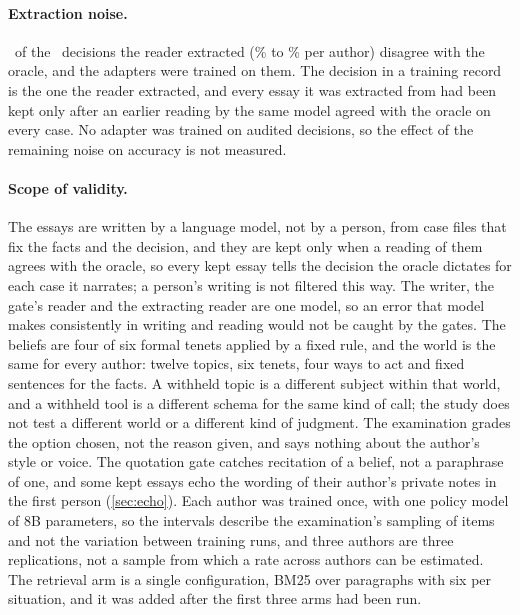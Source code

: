 \paragraph{Extraction noise.}
\AuditDisagreeAll\ of the \AuditKeptAll\ decisions the reader extracted
(\AuditDisagreeRateMin\% to \AuditDisagreeRateMax\% per author) disagree with the oracle, and
the adapters were trained on them. The decision in a training record is the one the reader
extracted, and every essay it was extracted from had been kept only after an earlier reading
by the same model agreed with the oracle on every case. No adapter
was trained on audited decisions, so the effect of the remaining noise on accuracy is not
measured.

\paragraph{Scope of validity.}
The essays are written by a language model, not by a person, from case files that fix the
facts and the decision, and they are kept only when a reading of them agrees with the oracle,
so every kept essay tells the decision the oracle dictates for each case it narrates; a
person's writing is not filtered this way. The writer, the gate's reader and the extracting
reader are one model, so an error that model makes consistently in writing and reading would
not be caught by the gates. The beliefs are four of six formal tenets applied by a fixed rule,
and the world is the same for every author: twelve topics, six tenets, four ways to act and
fixed sentences for the facts. A withheld topic is a different subject within that world, and
a withheld tool is a different schema for the same kind of call; the study does not test a
different world or a different kind of judgment. The examination grades the option chosen,
not the reason given, and says nothing about the author's style or voice. The quotation gate catches recitation of a belief, not a paraphrase of one, and some kept
essays echo the wording of their author's private notes in the first person
(\cref{sec:echo}). Each author was trained once, with
one policy model of 8B parameters, so the intervals describe the examination's sampling of
items and not the variation between training runs, and three authors are three replications,
not a sample from which a rate across authors can be estimated. The retrieval arm is a single
configuration, BM25 over paragraphs with six per situation, and it was added after the first
three arms had been run.
